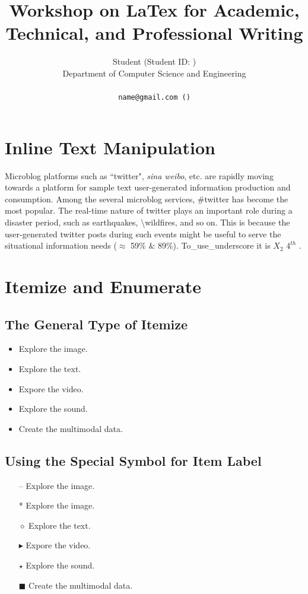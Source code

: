 \documentclass[11pt]{article}
\title{Workshop on LaTex for Academic, Technical, and Professional Writing}
\author{Student (Student ID:  ) \\
  Department of Computer Science and Engineering \\
  \affaddr{University of Chittagong, Chittagong, Bangladesh}\\
  {\tt name@gmail.com (\Letter)} \\
}
\begin{document}
%
\maketitle
\pagestyle{plain}

\section{Inline Text Manipulation}
\label{ref:inlineText}
Microblog platforms such as ``twitter", \emph{sina weibo}, etc. are rapidly moving towards a platform for $\mbox{sample text}$ user-generated information production and consumption. Among the several microblog services, \#twitter has become the most popular. The real-time nature of twitter plays an {\color{red} important role during a disaster period}, such as earthquakes, \textbackslash{wildfires}, and so on. This is because the user-generated twitter posts during such events might be useful to serve the situational information needs ($\approx$ 59\% \& 89\%). To\_use\_underscore it is $X_{2}$ $4^{th}$ .


\section{Itemize and Enumerate}
\label{ref:itemize}

\subsection{The General Type of Itemize}
\begin{itemize}
\item Explore the image.
\item Explore the text.
\item Expore the video.
\item Explore the sound.
\item Create the multimodal data.
\end{itemize}

\subsection{Using the Special Symbol for Item Label}
\begin{itemize}
\item[--] Explore the image.
\item[*] Explore the image.
\item[$\diamond$] Explore the text.
\item[$\blacktriangleright$] Expore the video.
\item[$\star$] Explore the sound.
\item[$\blacksquare$] Create the multimodal data.
\end{itemize}
\end{document}
